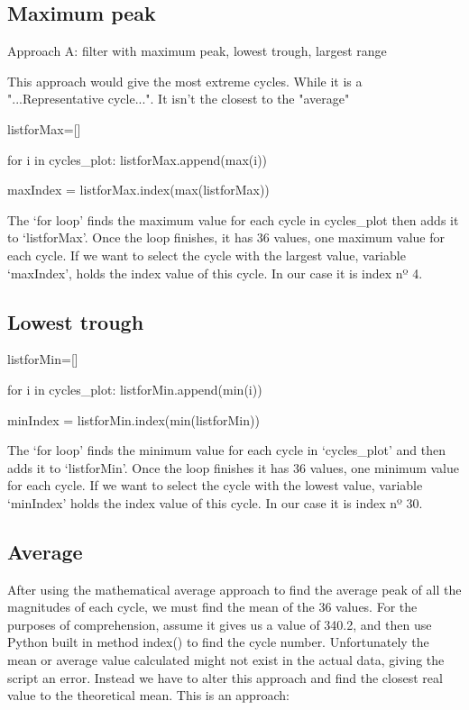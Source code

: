 \subsection{Maximum peak}
Approach A: filter with maximum peak, lowest trough, largest range 

This approach would give the most extreme cycles. While it is a "...Representative cycle...". It isn't the closest to the "average"

\begin{python}
listforMax=[]

for i in cycles_plot:
    listforMax.append(max(i))    
    
maxIndex = listforMax.index(max(listforMax))

\end{python}

The `for loop' finds the maximum value for each cycle in cycles\_plot then adds it to `listforMax'. Once the loop finishes, it has 36 values, one maximum value for each cycle. If we want to select the cycle with the largest value, variable `maxIndex', holds the index value of this cycle. In our case it is index nº 4.

\subsection{Lowest trough}

\begin{python}
listforMin=[]

for i in cycles_plot:
    listforMin.append(min(i))
    
minIndex = listforMin.index(min(listforMin))

\end{python}

The `for loop' finds the minimum value for each cycle in `cycles\_plot' and then adds it to `listforMin'. Once the loop finishes it has 36 values, one minimum value for each cycle. If we want to select the cycle with the lowest value, variable `minIndex' holds the index value of this cycle. In our case it is index nº 30.

\subsection{Average}
After using the mathematical average approach to find the average peak of all the magnitudes of each cycle, we must find the mean of the 36 values. For the purposes of comprehension, assume it gives us a value of 340.2, and then use Python built in method index() to find the cycle number. Unfortunately the mean or average value calculated might not exist in the actual data, giving the script an error. Instead we have to alter this approach and find the closest real value to the theoretical mean. This is an approach: 

